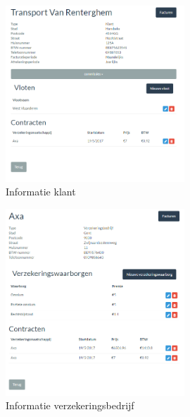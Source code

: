 \documentclass[11pt,openany]{article}
\begin{document}
\begin{figure}
	\centering
	\includegraphics[width=0.6\textwidth]{img/fig15.png}
	\caption{Informatie klant} 
	\label{fig:15} 
\end{figure}

\begin{figure}
	\centering
	\includegraphics[width=0.6\textwidth]{img/fig16.png}
	\caption{Informatie verzekeringsbedrijf} 
	\label{fig:16} 
\end{figure}
\end{document}
